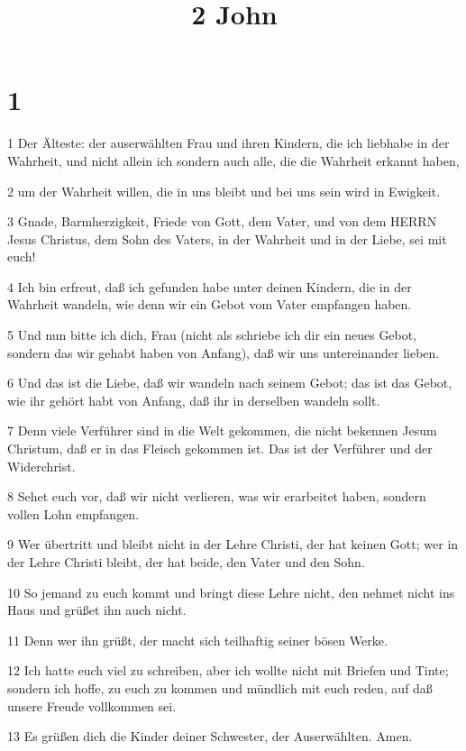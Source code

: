 

\title{2 John}


\chapter{1}

\par 1 Der Älteste: der auserwählten Frau und ihren Kindern, die ich liebhabe in der Wahrheit, und nicht allein ich sondern auch alle, die die Wahrheit erkannt haben,
\par 2 um der Wahrheit willen, die in uns bleibt und bei uns sein wird in Ewigkeit.
\par 3 Gnade, Barmherzigkeit, Friede von Gott, dem Vater, und von dem HERRN Jesus Christus, dem Sohn des Vaters, in der Wahrheit und in der Liebe, sei mit euch!
\par 4 Ich bin erfreut, daß ich gefunden habe unter deinen Kindern, die in der Wahrheit wandeln, wie denn wir ein Gebot vom Vater empfangen haben.
\par 5 Und nun bitte ich dich, Frau (nicht als schriebe ich dir ein neues Gebot, sondern das wir gehabt haben von Anfang), daß wir uns untereinander lieben.
\par 6 Und das ist die Liebe, daß wir wandeln nach seinem Gebot; das ist das Gebot, wie ihr gehört habt von Anfang, daß ihr in derselben wandeln sollt.
\par 7 Denn viele Verführer sind in die Welt gekommen, die nicht bekennen Jesum Christum, daß er in das Fleisch gekommen ist. Das ist der Verführer und der Widerchrist.
\par 8 Sehet euch vor, daß wir nicht verlieren, was wir erarbeitet haben, sondern vollen Lohn empfangen.
\par 9 Wer übertritt und bleibt nicht in der Lehre Christi, der hat keinen Gott; wer in der Lehre Christi bleibt, der hat beide, den Vater und den Sohn.
\par 10 So jemand zu euch kommt und bringt diese Lehre nicht, den nehmet nicht ins Haus und grüßet ihn auch nicht.
\par 11 Denn wer ihn grüßt, der macht sich teilhaftig seiner bösen Werke.
\par 12 Ich hatte euch viel zu schreiben, aber ich wollte nicht mit Briefen und Tinte; sondern ich hoffe, zu euch zu kommen und mündlich mit euch reden, auf daß unsere Freude vollkommen sei.
\par 13 Es grüßen dich die Kinder deiner Schwester, der Auserwählten. Amen.


